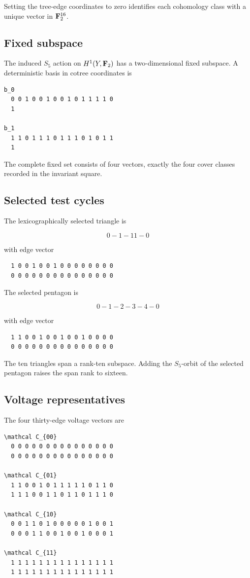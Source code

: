 Setting the tree-edge coordinates to zero identifies each cohomology
class with a unique vector in \(\mathbf F_2^{16}\).

\subsection{Fixed subspace}

The induced \(S_5\) action on \(H^1(Y,\mathbf F_2)\) has a two-dimensional
fixed subspace. A deterministic basis in cotree coordinates is

\begin{verbatim}
b_0
  0 0 1 0 0 1 0 0 1 0 1 1 1 1 0
  1

b_1
  1 1 0 1 1 1 0 1 1 1 0 1 0 1 1
  1
\end{verbatim}

The complete fixed set consists of four vectors, exactly the four cover
classes recorded in the invariant square.

\subsection{Selected test cycles}

The lexicographically selected triangle is

\[
0-1-11-0
\]

with edge vector

\begin{verbatim}
  1 0 0 1 0 0 1 0 0 0 0 0 0 0 0
  0 0 0 0 0 0 0 0 0 0 0 0 0 0 0
\end{verbatim}

The selected pentagon is

\[
0-1-2-3-4-0
\]

with edge vector

\begin{verbatim}
  1 1 0 0 1 0 0 1 0 0 1 0 0 0 0
  0 0 0 0 0 0 0 0 0 0 0 0 0 0 0
\end{verbatim}

The ten triangles span a rank-ten subspace. Adding the \(S_5\)-orbit of
the selected pentagon raises the span rank to sixteen.

\subsection{Voltage representatives}

The four thirty-edge voltage vectors are

\begin{verbatim}
\mathcal C_{00}
  0 0 0 0 0 0 0 0 0 0 0 0 0 0 0
  0 0 0 0 0 0 0 0 0 0 0 0 0 0 0

\mathcal C_{01}
  1 1 0 0 1 0 1 1 1 1 1 0 1 1 0
  1 1 1 0 0 1 1 0 1 1 0 1 1 1 0

\mathcal C_{10}
  0 0 1 1 0 1 0 0 0 0 0 1 0 0 1
  0 0 0 1 1 0 0 1 0 0 1 0 0 0 1

\mathcal C_{11}
  1 1 1 1 1 1 1 1 1 1 1 1 1 1 1
  1 1 1 1 1 1 1 1 1 1 1 1 1 1 1
\end{verbatim}

